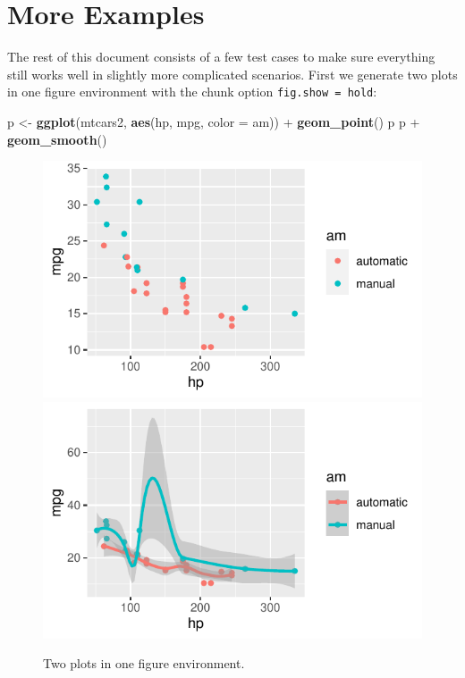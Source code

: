 \documentclass[]{tufte-book}
\newenvironment{Shaded}{}{}
\newcommand{\DataTypeTok}[1]{\textcolor[rgb]{0.56,0.13,0.00}{#1}}
\newcommand{\KeywordTok}[1]{\textcolor[rgb]{0.00,0.44,0.13}{\textbf{#1}}}
\newcommand{\NormalTok}[1]{#1}
\newcommand{\OperatorTok}[1]{\textcolor[rgb]{0.40,0.40,0.40}{#1}}
\newcommand{\StringTok}[1]{\textcolor[rgb]{0.25,0.44,0.63}{#1}}
\begin{document}
\hypertarget{more-examples}{%
\chapter{More Examples}\label{more-examples}}

The rest of this document consists of a few test cases to make sure
everything still works well in slightly more complicated scenarios.
First we generate two plots in one figure environment with the chunk
option \texttt{fig.show\ =\ \textquotesingle{}hold\textquotesingle{}}:

\begin{Shaded}
\begin{Highlighting}[]
\NormalTok{p <-}\StringTok{ }\KeywordTok{ggplot}\NormalTok{(mtcars2, }\KeywordTok{aes}\NormalTok{(hp, mpg, }\DataTypeTok{color =}\NormalTok{ am)) }\OperatorTok{+}
\StringTok{  }\KeywordTok{geom_point}\NormalTok{()}
\NormalTok{p}
\NormalTok{p }\OperatorTok{+}\StringTok{ }\KeywordTok{geom_smooth}\NormalTok{()}
\end{Highlighting}
\end{Shaded}

\begin{figure}
\includegraphics{deleteme_files/figure-latex/fig-two-together-1} \includegraphics{deleteme_files/figure-latex/fig-two-together-2} \caption[Two plots in one figure environment]{Two plots in one figure environment.}\label{fig:fig-two-together}
\end{figure}
\end{document}
